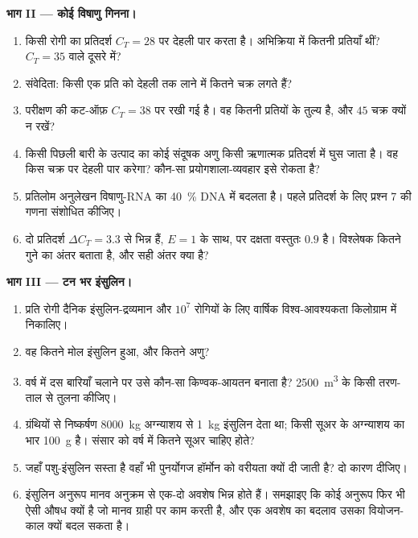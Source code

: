 \begin{problem}
\medskip
\noindent\textbf{भाग II --- कोई विषाणु गिनना।}
\begin{enumerate}[resume]
  \item किसी रोगी का प्रतिदर्श $C_{T} = 28$ पर देहली पार करता है।
        अभिक्रिया में कितनी प्रतियाँ थीं? $C_{T} = 35$ वाले दूसरे में?
  \item संवेदिता: किसी एक प्रति को देहली तक लाने में कितने चक्र लगते
        हैं?
  \item परीक्षण की कट-ऑफ़ $C_{T} = 38$ पर रखी गई है। वह कितनी
        प्रतियों के तुल्य है, और $45$ चक्र क्यों न रखें?
  \item किसी पिछली बारी के उत्पाद का कोई संदूषक अणु किसी ऋणात्मक
        प्रतिदर्श में घुस जाता है। वह किस चक्र पर देहली पार करेगा?
        कौन-सा प्रयोगशाला-व्यवहार इसे रोकता है?
  \item प्रतिलोम अनुलेखन विषाणु-RNA का \qty{40}{\%} DNA में बदलता है।
        पहले प्रतिदर्श के लिए प्रश्न 7 की गणना संशोधित कीजिए।
  \item दो प्रतिदर्श $\Delta C_{T} = 3.3$ से भिन्न हैं, $E = 1$ के
        साथ, पर दक्षता वस्तुतः $0.9$ है। विश्लेषक कितने गुने का अंतर
        बताता है, और सही अंतर क्या है?
\end{enumerate}

\medskip
\noindent\textbf{भाग III --- टन भर इंसुलिन।}
\begin{enumerate}[resume]
  \item प्रति रोगी दैनिक इंसुलिन-द्रव्यमान और $10^{7}$ रोगियों के लिए
        वार्षिक विश्व-आवश्यकता किलोग्राम में निकालिए।
  \item वह कितने मोल इंसुलिन हुआ, और कितने अणु?
  \item वर्ष में दस बारियाँ चलाने पर उसे कौन-सा किण्वक-आयतन बनाता है?
        \qty{2500}{m^3} के किसी तरण-ताल से तुलना कीजिए।
  \item ग्रंथियों से निष्कर्षण \qty{8000}{kg} अग्न्याशय से
        \qty{1}{kg} इंसुलिन देता था; किसी सूअर के अग्न्याशय का भार
        \qty{100}{g} है। संसार को वर्ष में कितने सूअर चाहिए होते?
  \item जहाँ पशु-इंसुलिन सस्ता है वहाँ भी पुनर्योगज हॉर्मोन को वरीयता
        क्यों दी जाती है? दो कारण दीजिए।
  \item इंसुलिन अनुरूप मानव अनुक्रम से एक-दो अवशेष भिन्न होते हैं।
        समझाइए कि कोई अनुरूप फिर भी ऐसी औषध क्यों है जो मानव ग्राही
        पर काम करती है, और एक अवशेष का बदलाव उसका वियोजन-काल क्यों
        बदल सकता है।
\end{enumerate}


\end{problem}

